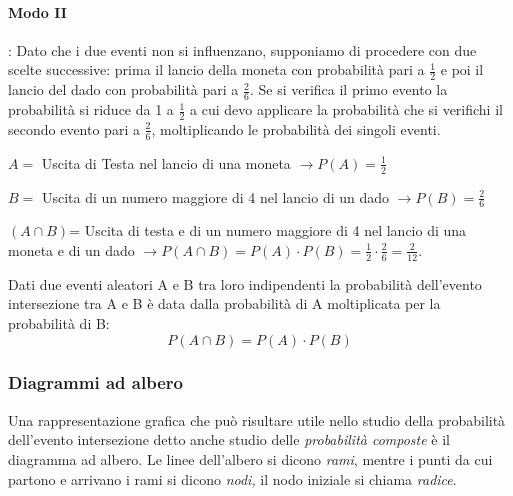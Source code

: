 \begin{esempio}
\begin{center}
 
\end{center}

\paragraph{Modo II}: Dato che i due eventi non si influenzano, supponiamo 
di 
procedere con due scelte successive: prima il lancio della moneta con 
probabilità pari a \(\frac 1 2\) e poi il lancio del dado con probabilità 
pari a 
\(\frac 2 6\). Se si verifica il primo evento la probabilità si riduce da 1 a 
\(\frac 1 2\) a cui devo applicare la probabilità che si verifichi il secondo 
evento pari a \(\frac 2 6\), moltiplicando le probabilità dei singoli eventi.
\begin{itemize*}
\item \( A = \) Uscita di Testa nel lancio di una moneta \(\to P(A)=\frac 1 2\)
\item \( B = \) Uscita di un numero maggiore di 4 nel lancio di un dado \(\to 
P(B)=\frac 2 6\)
\item \((A\cap B)\)= Uscita di testa e di un numero maggiore di 4 nel lancio 
di 
una moneta e di un dado \(\to P(A\cap B)=P(A)\cdot P(B)=\frac 1 2\cdot \frac 
2 
6=\frac 2{12}\).
\end{itemize*}
\end{esempio}

\begin{teorema}
Dati due eventi aleatori A e B tra loro indipendenti la 
probabilità dell'evento intersezione tra A e B è data dalla probabilità di 
A 
moltiplicata per la probabilità di B: \[P(A\cap B)=P(A)\cdot P(B)\]
\end{teorema}

\subsubsection*{Diagrammi ad albero}
Una rappresentazione grafica che può risultare utile nello studio della 
probabilità dell'evento intersezione detto anche studio delle 
\emph{probabilità composte} è il diagramma ad albero. Le linee dell'albero 
si dicono \emph{rami}, 
mentre i punti da cui partono e arrivano i rami si dicono \emph{nodi,} il 
nodo iniziale si chiama \emph{radice}.

